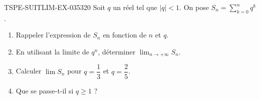 \begin{exercice}{TSPE-SUITLIM-EX-035}{3}{20}
Soit $q$ un réel tel que $|q| < 1$. On pose $S_n = \displaystyle\sum_{k=0}^{n} q^k$.
\begin{enumerate}
  \item Rappeler l'expression de $S_n$ en fonction de $n$ et $q$.
  \item En utilisant la limite de $q^n$, déterminer $\lim_{n \to +\infty} S_n$.
  \item Calculer $\lim S_n$ pour $q = \dfrac{1}{3}$ et $q = \dfrac{2}{5}$.
  \item Que se passe-t-il si $q \geq 1$ ?
\end{enumerate}
\end{exercice}
